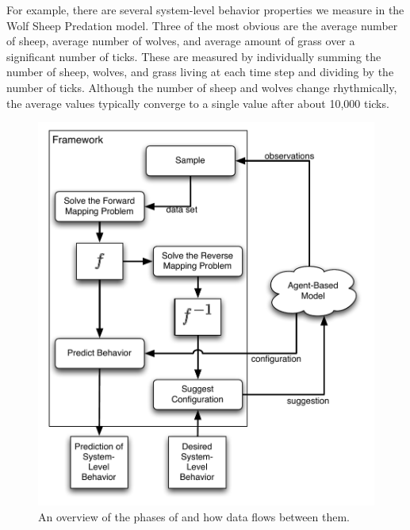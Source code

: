 For example, there are several system-level behavior properties we measure in the Wolf Sheep Predation model.
Three of the most obvious are the average number of sheep, average number of wolves, and average amount of grass over a significant number of ticks.
These are measured by individually summing the number of sheep, wolves, and grass living at each time step and dividing by the number of ticks.
Although the number of sheep and wolves change rhythmically, the average values typically converge to a single value after about 10,000 ticks.


\begin{figure}[H]
\centering
\includegraphics[scale=1]{images/framework.pdf}
\caption{An overview of the phases of \fw and how data flows between them.}
\label{fig:frameworkdiag}
\end{figure}



